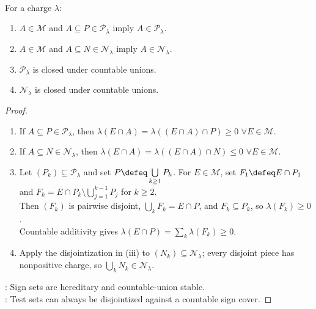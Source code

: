 \begin{proposition} \label{prop:positive-negative-set-closure-charge} \\
For a charge $\lambda$:
\begin{enumerate}[label=(\roman*)]
\setlength{\itemsep}{0pt}
\item $A\in\mathcal{M}$ and $A\subseteq P\in\mathcal{P}_\lambda$ imply $A\in\mathcal{P}_\lambda$.
\item $A\in\mathcal{M}$ and $A\subseteq N\in\mathcal{N}_\lambda$ imply $A\in\mathcal{N}_\lambda$.
\item $\mathcal{P}_\lambda$ is closed under countable unions.
\item $\mathcal{N}_\lambda$ is closed under countable unions.
\end{enumerate}
\begin{proof}
\begin{enumerate}[label=(\roman*)]
\setlength{\itemsep}{0pt}
\item If $A\subseteq P\in\mathcal{P}_\lambda$, then $\lambda(E\cap A)=\lambda((E\cap A)\cap P)\geq0$ $\forall E\in\mathcal{M}$.
\item If $A\subseteq N\in\mathcal{N}_\lambda$, then $\lambda(E\cap A)=\lambda((E\cap A)\cap N)\leq0$ $\forall E\in\mathcal{M}$.
\item Let $(P_k)\subseteq\mathcal{P}_\lambda$ and set $P\defeq\bigcup\limits_{k\geq1}P_k$. For $E\in\mathcal{M}$, set $F_1\defeq E\cap P_1$ and
$F_k=E\cap P_k\setminus\bigcup\limits_{j=1}^{k-1}P_j$ for $k\geq2$.\\
Then $(F_k)$ is pairwise disjoint, $\bigcup\limits_kF_k=E\cap P$, and $F_k\subseteq P_k$, so $\lambda(F_k)\geq0$.\\
Countable additivity gives $\lambda(E\cap P)=\sum\limits_k\lambda(F_k)\geq0$.
\item Apply the disjointization in (iii) to $(N_k)\subseteq\mathcal{N}_\lambda$; every disjoint piece has nonpositive charge, so $\bigcup\limits_kN_k\in\mathcal{N}_\lambda$.
\end{enumerate}
: Sign sets are hereditary and countable-union stable.\\
: Test sets can always be disjointized against a countable sign cover.
\end{proof}
\end{proposition}

